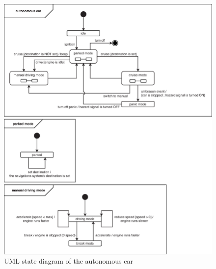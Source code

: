 \documentclass[12pt]{article}
\begin{document}
\begin{spacing}{1.5}
\begin{figure}[h!]
	\centering
		\includegraphics[width=1\textwidth]{./figures/eps/EFSM.eps}
		  \caption{UML state diagram of the autonomous car}
  \label{fig:state-diagram}
\end{figure}
\begin{figure}[h!]
	\centering

\end{figure}
\end{spacing}
\end{document}

